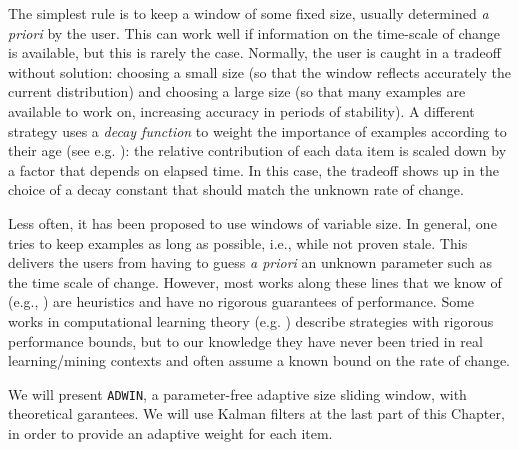 The simplest rule is to keep a window
of some fixed size, usually determined {\em a priori} by the user.
This can work well if information on the time-scale
of change is available, but this is rarely the case.
Normally, the user is caught in a tradeoff without solution:
choosing a small size (so that the window reflects accurately the current distribution)
and choosing a large size (so that many examples are available to work on, 
increasing accuracy in periods of stability).
A different strategy uses a {\em decay function}
to weight the importance of examples according to their
age (see e.g. \cite{CS03}):
the relative contribution of each data item 
 is scaled down by a factor that depends on %
elapsed time.
In this case, the tradeoff shows up in the 
choice of a decay constant that should match the unknown rate of change.


Less often, it has been proposed to use windows of variable size.
In general, one tries to keep examples as long as possible, i.e., 
while not proven stale. This delivers
the users from having to guess {\em a priori} an unknown parameter such
as the time scale of change. However, most works along these lines 
that we know of (e.g., \cite{Gama,Klinkenberg,olin,WidmerKubat})
are heuristics and have no rigorous guarantees of performance. 
Some works in computational learning theory 
(e.g. \cite{bartlett00,helmbold94tracking,herbster95tracking}) 
describe strategies with rigorous performance
bounds, but to our knowledge they have never been tried
in real learning/mining contexts and often assume a known bound 
on the rate of change. 

We will present {\tt ADWIN}, a parameter-free adaptive size sliding
window, with theoretical garantees. We will
use Kalman filters at the last part of this Chapter, in order
to provide an adaptive weight for each item. %







%